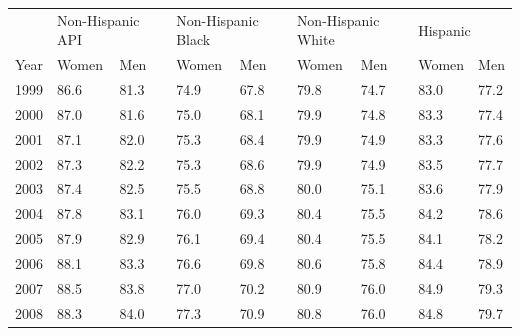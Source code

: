 \documentclass[
  11pt,
]{article}
\begin{document}
\begin{table}[h]
\begin{tabular}{@{}llllllllllll@{}}
\toprule
          & \multicolumn{2}{l}{Non-Hispanic API} &  & \multicolumn{2}{l}{Non-Hispanic Black} &  & \multicolumn{2}{l}{Non-Hispanic White} &  & \multicolumn{2}{l}{Hispanic} \\ \cmidrule(lr){2-3} \cmidrule(lr){5-6} \cmidrule(lr){8-9} \cmidrule(l){11-12} 
Year      & Women             & Men              &  & Women              & Men               &  & Women              & Men               &  & Women         & Men          \\ \midrule
1999      & 86.6              & 81.3             &  & 74.9               & 67.8              &  & 79.8               & 74.7              &  & 83.0          & 77.2         \\
2000      & 87.0              & 81.6             &  & 75.0               & 68.1              &  & 79.9               & 74.8              &  & 83.3          & 77.4         \\
2001      & 87.1              & 82.0             &  & 75.3               & 68.4              &  & 79.9               & 74.9              &  & 83.3          & 77.6         \\
2002      & 87.3              & 82.2             &  & 75.3               & 68.6              &  & 79.9               & 74.9              &  & 83.5          & 77.7         \\
2003      & 87.4              & 82.5             &  & 75.5               & 68.8              &  & 80.0               & 75.1              &  & 83.6          & 77.9         \\
2004      & 87.8              & 83.1             &  & 76.0               & 69.3              &  & 80.4               & 75.5              &  & 84.2          & 78.6         \\
2005      & 87.9              & 82.9             &  & 76.1               & 69.4              &  & 80.4               & 75.5              &  & 84.1          & 78.2         \\
2006      & 88.1              & 83.3             &  & 76.6               & 69.8              &  & 80.6               & 75.8              &  & 84.4          & 78.9         \\
2007      & 88.5              & 83.8             &  & 77.0               & 70.2              &  & 80.9               & 76.0              &  & 84.9          & 79.3         \\
2008      & 88.3              & 84.0             &  & 77.3               & 70.9              &  & 80.8               & 76.0              &  & 84.8          & 79.7         \\

\end{tabular}
\end{table}
\end{document}
